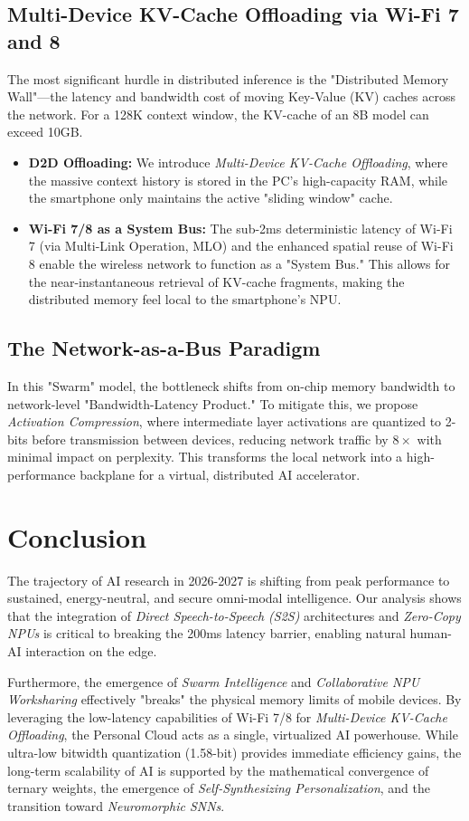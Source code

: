 \documentclass[twocolumn,10pt]{article}
\begin{document}
\subsection{Multi-Device KV-Cache Offloading via Wi-Fi 7 and 8}
The most significant hurdle in distributed inference is the "Distributed Memory Wall"—the latency and bandwidth cost of moving Key-Value (KV) caches across the network. For a 128K context window, the KV-cache of an 8B model can exceed 10GB.
\begin{itemize}
    \item \textbf{D2D Offloading:} We introduce \textit{Multi-Device KV-Cache Offloading}, where the massive context history is stored in the PC's high-capacity RAM, while the smartphone only maintains the active "sliding window" cache.
    \item \textbf{Wi-Fi 7/8 as a System Bus:} The sub-2ms deterministic latency of Wi-Fi 7 (via Multi-Link Operation, MLO) and the enhanced spatial reuse of Wi-Fi 8 enable the wireless network to function as a "System Bus." This allows for the near-instantaneous retrieval of KV-cache fragments, making the distributed memory feel local to the smartphone's NPU.
\end{itemize}

\subsection{The Network-as-a-Bus Paradigm}
In this "Swarm" model, the bottleneck shifts from on-chip memory bandwidth to network-level "Bandwidth-Latency Product." To mitigate this, we propose \textit{Activation Compression}, where intermediate layer activations are quantized to 2-bits before transmission between devices, reducing network traffic by $8\times$ with minimal impact on perplexity. This transforms the local network into a high-performance backplane for a virtual, distributed AI accelerator.

\section{Conclusion}
The trajectory of AI research in 2026-2027 is shifting from peak performance to sustained, energy-neutral, and secure omni-modal intelligence. Our analysis shows that the integration of \textit{Direct Speech-to-Speech (S2S)} architectures and \textit{Zero-Copy NPUs} is critical to breaking the 200ms latency barrier, enabling natural human-AI interaction on the edge. 

Furthermore, the emergence of \textit{Swarm Intelligence} and \textit{Collaborative NPU Worksharing} effectively "breaks" the physical memory limits of mobile devices. By leveraging the low-latency capabilities of Wi-Fi 7/8 for \textit{Multi-Device KV-Cache Offloading}, the Personal Cloud acts as a single, virtualized AI powerhouse. While ultra-low bitwidth quantization (1.58-bit) provides immediate efficiency gains, the long-term scalability of AI is supported by the mathematical convergence of ternary weights, the emergence of \textit{Self-Synthesizing Personalization}, and the transition toward \textit{Neuromorphic SNNs}.
\end{document}
